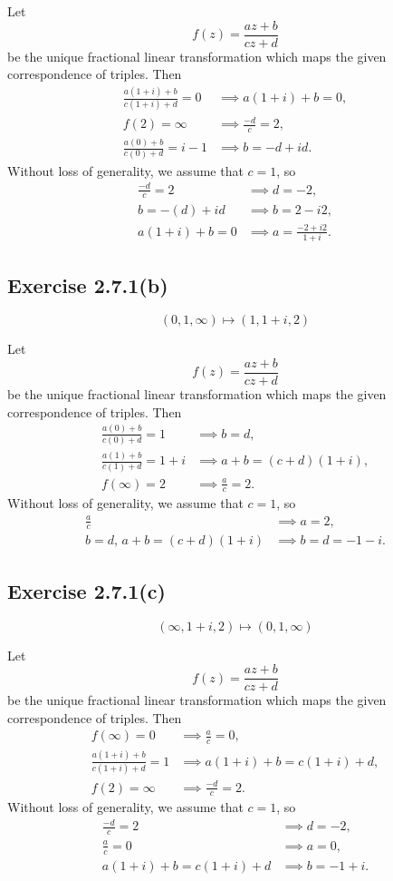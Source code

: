 \documentclass[12pt]{article}
\newenvironment{problem}
    {\begin{lrbox}{\mybox}\begin{minipage}{\textwidth-10pt}}
    {\end{minipage}\end{lrbox}\framebox[6.5in]{\usebox{\mybox}}}
\begin{document}
Let
\[f(z) = \frac{az+b}{cz+d}\]
be the unique fractional linear transformation which maps the given correspondence of triples. Then
\begin{align*}
    \frac{a(1+i)+b}{c(1+i)+d} = 0 &\implies a(1+i) + b = 0, \\
    f(2) = \infty &\implies \frac{-d}{c} = 2, \\
    \frac{a(0)+b}{c(0)+d} = i-1 &\implies b = -d + id.
\end{align*}
Without loss of generality, we assume that $c=1$, so
\begin{align*}
    \frac{-d}{c} = 2 &\implies d = -2, \\
    b = -(d) + id &\implies b = 2 - i2, \\
    a(1+i) + b = 0 &\implies a = \frac{-2+i2}{1+i}.
\end{align*}

\subsection*{Exercise 2.7.1(b)}
\begin{problem}
    \[(0, 1, \infty)\mapsto(1, 1+i, 2)\]
\end{problem}
\medskip

Let
\[f(z) = \frac{az+b}{cz+d}\]
be the unique fractional linear transformation which maps the given correspondence of triples. Then
\begin{align*}
    \frac{a(0)+b}{c(0)+d} = 1 &\implies b=d, \\
    \frac{a(1)+b}{c(1)+d} = 1+i &\implies a+b = (c+d)(1+i), \\
    f(\infty) = 2 &\implies \frac{a}{c} = 2.
\end{align*}
Without loss of generality, we assume that $c=1$, so
\begin{align*}
    \frac{a}{c} &\implies a=2, \\
    b=d,\, a+b = (c+d)(1+i) &\implies b = d = -1-i.
\end{align*}

\subsection*{Exercise 2.7.1(c)}
\begin{problem}
    \[(\infty, 1+i, 2)\mapsto(0, 1, \infty)\]
\end{problem}
\medskip

Let
\[f(z) = \frac{az+b}{cz+d}\]
be the unique fractional linear transformation which maps the given correspondence of triples. Then
\begin{align*}
    f(\infty) = 0 &\implies \frac{a}{c} = 0, \\
    \frac{a(1+i)+b}{c(1+i)+d} = 1 &\implies a(1+i)+b = c(1+i)+d, \\
    f(2) = \infty &\implies \frac{-d}{c} = 2.
\end{align*}
Without loss of generality, we assume that $c=1$, so
\begin{align*}
    \frac{-d}{c} = 2 &\implies d = -2, \\
    \frac{a}{c} = 0 &\implies a=0, \\
    a(1+i)+b = c(1+i)+d &\implies b = -1+i.
\end{align*}
\end{document}
